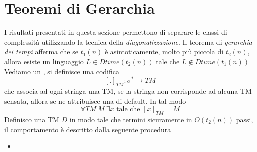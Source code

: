 \documentclass[10pt, letterpaper]{report}
\begin{document}
\section{Teoremi di Gerarchia}
I risultati presentati in questa sezione permettono di separare le classi di complessità utilizzando la tecnica della \textit{diagonalizzazione}.\acc 
Il teorema di \textit{gerarchia dei tempi} afferma che se $t_1(n)$ è asintoticamente, molto più piccola di $t_2(n)$, allora esiste un linguaggio $L\in Dtime(t_2(n))$ tale che 
$L\notin Dtime(t_1(n))$\acc 
Vediamo un , si definisce una codifica $$[.]_{TM}:\sigma^*\rightarrow TM $$
che associa ad ogni stringa una TM, se la stringa non corrisponde ad alcuna TM sensata, allora se ne attribuisce una di default. In tal modo 
$$ \forall TM \ M  \ \exists x \text{ tale che }[x]_{TM}=M$$
Definisco una TM $D$ in modo tale che termini sicuramente in $O(t_2(n))$ passi, il comportamento è descritto dalla seguente procedura \begin{itemize}
    \item 
\end{itemize}
\end{document}
